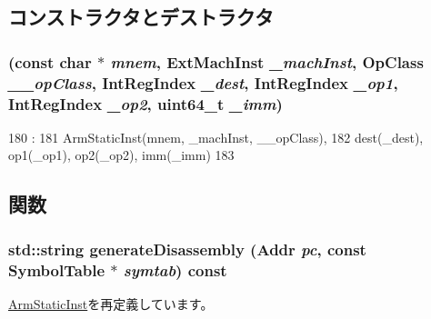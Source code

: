 \subsection{コンストラクタとデストラクタ}
\hypertarget{classArmISA_1_1DataX2RegImmOp_a30fe65daa8703b82b118a4b953ca5462}{
\subsubsection[{DataX2RegImmOp}]{ (const char $\ast$ {\em mnem}, \/  {\bf ExtMachInst} {\em \_\-machInst}, \/  OpClass {\em \_\-\_\-opClass}, \/  {\bf IntRegIndex} {\em \_\-dest}, \/  {\bf IntRegIndex} {\em \_\-op1}, \/  {\bf IntRegIndex} {\em \_\-op2}, \/  uint64\_\-t {\em \_\-imm})}}
\label{classArmISA_1_1DataX2RegImmOp_a30fe65daa8703b82b118a4b953ca5462}



\begin{DoxyCode}
180                                   :
181         ArmStaticInst(mnem, _machInst, __opClass),
182         dest(_dest), op1(_op1), op2(_op2), imm(_imm)
183     {}

\end{DoxyCode}


\subsection{関数}
\hypertarget{classArmISA_1_1DataX2RegImmOp_a95d323a22a5f07e14d6b4c9385a91896}{
\subsubsection[{generateDisassembly}]{\setlength{\rightskip}{0pt plus 5cm}std::string generateDisassembly ({\bf Addr} {\em pc}, \/  const SymbolTable $\ast$ {\em symtab}) const}}
\label{classArmISA_1_1DataX2RegImmOp_a95d323a22a5f07e14d6b4c9385a91896}


\hyperlink{classArmISA_1_1ArmStaticInst_a95d323a22a5f07e14d6b4c9385a91896}{ArmStaticInst}を再定義しています。



